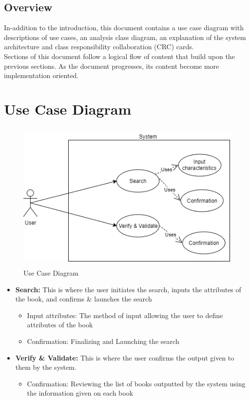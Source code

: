 \documentclass[12pt]{article}
\begin{document}
\subsection{Overview}
In-addition to the introduction, this document contains a use case diagram with descriptions of use cases, an analysis class diagram, an explanation of the system architecture and class responsibility collaboration (CRC) cards.\\

\noindent Sections of this document follow a logical flow of content that build upon the previous sections. As the document progresses, its content become more implementation oriented.

\newpage
\section{Use Case Diagram}
\label{sec:use_case_diagram}
\begin{figure}[h]
\centering
\includegraphics[height=75mm]{UseCase.png}
\caption{Use Case Diagram}
\label{fig:use_case}
\end{figure}
\begin{itemize}
    \item \textbf{Search: } This is where the user initiates the search, inputs the attributes of the book, and confirms \& launches the search
    \begin{itemize}
        \item Input attributes: The method of input allowing the user to define attributes of the book
        \item Confirmation: Finalizing and Launching the search
    \end{itemize}
    \item \textbf{Verify \& Validate: } This is where the user confirms the output given to them by the system.
        \begin{itemize}
        \item Confirmation: Reviewing the list of books outputted by the system using the information given on each book
    \end{itemize}
\end{itemize}
\newpage
\end{document}
